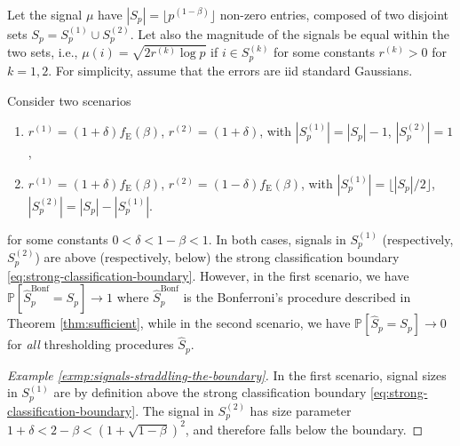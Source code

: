 \begin{example}
\label{exmp:signals-straddling-the-boundary}
Let the signal $\mu$ have $|S_p| = \lfloor p^{(1-\beta)} \rfloor$ non-zero entries, composed of two disjoint sets $S_p = S_p^{(1)}\cup S_p^{(2)}$.
Let also the magnitude of the signals be equal within the two sets, i.e., $\mu(i)=\sqrt{2r^{(k)}\log{p}}$ if $i\in S_p^{(k)}$ for some constants $r^{(k)} > 0$ for $k=1,2$.
For simplicity, assume that the errors are iid standard Gaussians.

Consider two scenarios
\begin{enumerate}
    \item $r^{(1)} = (1+\delta)f_{\mathrm{E}}(\beta)$, $r^{(2)} = (1+\delta)$,  with $|S_p^{(1)}|=|S_p|-1$, $|S_p^{(2)}|=1$, 
    \item $r^{(1)} = (1+\delta)f_{\mathrm{E}}(\beta)$, $r^{(2)} = (1-\delta)f_{\mathrm{E}}(\beta)$, with $|S_p^{(1)}|=\lfloor|S_p|/2\rfloor$, $|S_p^{(2)}|=|S_p| - |S_p^{(1)}|$.
\end{enumerate}
for some constants $0<\delta<1-\beta<1$. 
In both cases, signals in $S_p^{(1)}$ (respectively, $S_p^{(2)}$) are above (respectively, below) the strong classification boundary \eqref{eq:strong-classification-boundary}.
However, in the first scenario, we have $\mathbb{P}[\widehat{S}^{\text{Bonf}}_p=S_p]\to 1$ where $\widehat{S}^{\text{Bonf}}_p$ is the Bonferroni's procedure described in Theorem \ref{thm:sufficient}, 
while in the second scenario, we have $\mathbb{P}[\widehat{S}_p=S_p]\to 0$ for \emph{all} thresholding procedures $\widehat{S}_p$.

\begin{proof}[Example \ref{exmp:signals-straddling-the-boundary}]
In the first scenario, signal sizes in $S^{(1)}_p$ are by definition above the strong classification boundary \eqref{eq:strong-classification-boundary}.
The signal in $S^{(2)}_p$ has size parameter $1+\delta<2-\beta<(1+\sqrt{1-\beta})^2$, and therefore falls below the boundary.


\end{proof}
\end{example}

